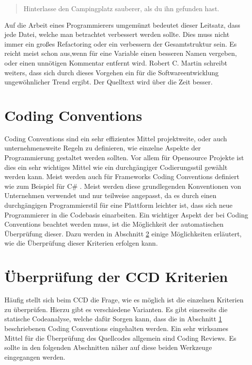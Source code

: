 \begin{quote}
	Hinterlasse den Campingplatz sauberer, als du ihn gefunden hast.
\end{quote}

\SuperPar Auf die Arbeit eines Programmierers umgemünzt bedeutet dieser Leitsatz, dass jede Datei, welche man betrachtet verbessert werden sollte. Dies muss nicht immer ein großes Refactoring oder ein verbessern der Gesamtstruktur sein. Es reicht meist schon aus,wenn für eine Variable einen besseren Namen vergeben, oder einen unnötigen Kommentar entfernt wird. Robert C. Martin schreibt weiters, dass sich durch dieses Vorgehen ein für die Softwareentwicklung ungewöhnlicher Trend ergibt. Der Quelltext wird über die Zeit besser. 

\section{Coding Conventions}
\label{cha:CodingConventions}
Coding Conventions sind ein sehr effizientes Mittel projektweite, oder auch unternehmensweite Regeln zu definieren, wie einzelne Aspekte der Programmierung gestaltet werden sollten. Vor allem für Opensource Projekte ist dies ein sehr wichtiges Mittel wie ein durchgängiger Codierungsstil gewählt werden kann. Meist werden auch für Frameworks Coding Conventions definiert wie zum Beispiel für C\# \cite{Microsoft2016}. Meist werden diese grundlegenden Konventionen von Unternehmen verwendet und nur teilweise angepasst, da es durch einen durchgängigen Programmierstil für eine Plattform leichter ist, dass sich neue Programmierer in die Codebasis einarbeiten. Ein wichtiger Aspekt der bei Coding Conventions beachtet werden muss, ist die Möglichkeit der automatischen Überprüfung dieser. Dazu werden in Abschnitt \ref{cha:CheckingCCDCriterias} einige Möglichkeiten erläutert, wie die Überprüfung dieser Kriterien erfolgen kann.

 
\section{Überprüfung der CCD Kriterien}
\label{cha:CheckingCCDCriterias}
Häufig stellt sich beim CCD die Frage, wie es möglich ist die einzelnen Kriterien zu überprüfen. Hierzu gibt es verschiedene Varianten. Es gibt einerseits die statische Codeanalyse, welche dafür Sorgen kann, dass die in Abschnitt \ref{cha:CodingConventions} beschriebenen Coding Conventions eingehalten werden. Ein sehr wirksames Mittel für die Überprüfung des Quellcodes allgemein sind Coding Reviews. Es sollte in den folgenden Abschnitten näher auf diese beiden Werkzeuge eingegangen werden.

